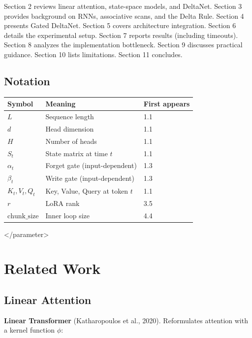 Section 2 reviews linear attention, state-space models, and DeltaNet. 
Section 3 provides background on RNNs, associative scans, and the Delta 
Rule. Section 4 presents Gated DeltaNet. Section 5 covers architecture 
integration. Section 6 details the experimental setup. Section 7 reports 
results (including timeouts). Section 8 analyzes the implementation 
bottleneck. Section 9 discusses practical guidance. Section 10 lists 
limitations. Section 11 concludes.



\subsection{Notation}

\begin{table}[H]
\centering
\small
\begin{tabular}{lll}
\toprule
\textbf{Symbol} & \textbf{Meaning} & \textbf{First appears} \\
\midrule
$L$ & Sequence length & 1.1 \\
$d$ & Head dimension & 1.1 \\
$H$ & Number of heads & 1.1 \\
$S_t$ & State matrix at time $t$ & 1.1 \\
$\alpha_t$ & Forget gate (input-dependent) & 1.3 \\
$\beta_t$ & Write gate (input-dependent) & 1.3 \\
$K_t, V_t, Q_t$ & Key, Value, Query at token $t$ & 1.1 \\
$r$ & LoRA rank & 3.5 \\
$\text{chunk\_size}$ & Inner loop size & 4.4 \\
\bottomrule
\end{tabular}
\end{table}
\textless{}/parameter\textgreater{}




\section{Related Work}

\subsection{Linear Attention}

\textbf{Linear Transformer} (Katharopoulos et al., 2020). Reformulates attention 
with a kernel function $\phi$:

